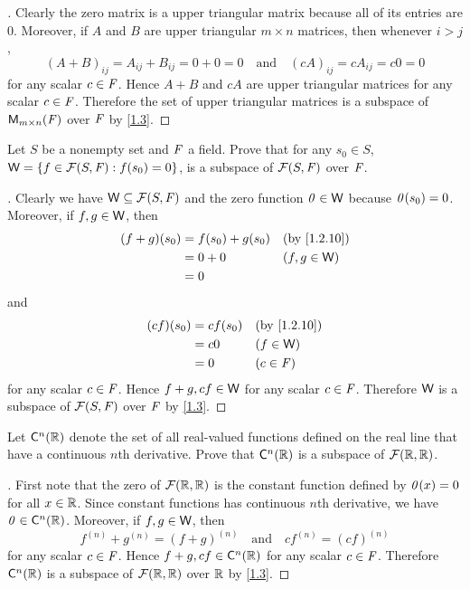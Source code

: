 \begin{proof}[]
  Clearly the zero matrix is a upper triangular matrix because all of its entries are \(0\).
  Moreover, if \(A\) and \(B\) are upper triangular \(m \times n\) matrices, then whenever \(i > j\),
  \[
    (A + B)_{i j} = A_{i j} + B_{i j} = 0 + 0 = 0 \quad \text{and} \quad (cA)_{i j} = cA_{i j} = c0 = 0
  \]
  for any scalar \(c \in \mathit{F}\).
  Hence \(A + B\) and \(cA\) are upper triangular matrices for any scalar \(c \in \mathit{F}\).
  Therefore the set of upper triangular matrices is a subspace of \(\mathsf{M}_{{m} \times n}({\mathit{F}})\) over \(\mathit{F}\) by \cref{1.3}.
\end{proof}

\begin{ex}\label{ex:1.3.13}
  Let \(S\) be a nonempty set and \(\mathit{F}\) a field.
  Prove that for any \(s_0 \in S\), \(\W = \set{f \in \FS : f(s_0) = 0}\), is a subspace of \(\FS\) over \(\mathit{F}\).
\end{ex}

\begin{proof}[]
  Clearly we have \(\W \subseteq \FS\) and the zero function \(\mathit{0} \in \mathsf{W}\) because \(\mathit{0}(s_0) = 0\).
  Moreover, if \(f, g \in \mathsf{W}\), then
  \begin{align*}
    (f + g)(s_0) & = f(s_0) + g(s_0) &  & \text{(by \cref{1.2.10})} \\
                 & = 0 + 0           &  & (f, g \in \W)             \\
                 & = 0
  \end{align*}
  and
  \begin{align*}
    (cf)(s_0) & = cf(s_0) &  & \text{(by \cref{1.2.10})} \\
              & = c0      &  & (f \in \W)                \\
              & = 0       &  & (c \in \F)
  \end{align*}
  for any scalar \(c \in \mathit{F}\).
  Hence \(f + g, cf \in \mathsf{W}\) for any scalar \(c \in \mathit{F}\).
  Therefore \(\mathsf{W}\) is a subspace of \(\FS\) over \(\mathit{F}\) by \cref{1.3}.
\end{proof}

\setcounter{ex}{15}
\begin{ex}\label{ex:1.3.16}
  Let \(\cfs[n]{\R}\) denote the set of all real-valued functions defined on the real line that have a continuous \(n\)th derivative.
  Prove that \(\cfs[n]{\R}\) is a subspace of \(\fs{\R}{\R}\).
\end{ex}

\begin{proof}[]
  First note that the zero of \(\fs{\R}{\R}\) is the constant function defined by \(\mathit{0}(x) = 0\) for all \(x \in \mathbb{R}\).
  Since constant functions has continuous \(n\)th derivative, we have \(\zv \in \cfs[n]{\R}\).
  Moreover, if \(f, g \in \mathsf{W}\), then
  \[
    f^{(n)} + g^{(n)} = (f + g)^{(n)} \quad \text{and} \quad cf^{(n)} = (cf)^{(n)}
  \]
  for any scalar \(c \in \mathit{F}\).
  Hence \(f + g, cf \in \cfs[n]{\R}\) for any scalar \(c \in \mathit{F}\).
  Therefore \(\cfs[n]{\R}\) is a subspace of \(\fs{\R}{\R}\) over \(\mathbb{R}\) by \cref{1.3}.
\end{proof}

